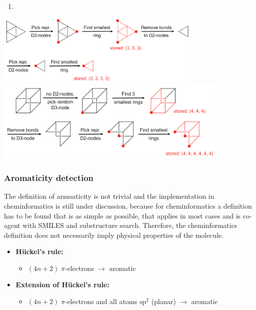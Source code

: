 \begin{enumerate}
    \item 
\end{enumerate}

\begin{center}\includegraphics[width=0.75\textwidth]{img/cheminformatics/RingPerceptionFigueras1.png}\\\includegraphics[width=0.85\textwidth]{img/cheminformatics/RingPerceptionFigueras2.png}\end{center}

%

\subsubsection{Aromaticity detection}

The definition of armoaticity is not trivial and the implementation in cheminformatics is still under discussion, because for cheminformatics a definition has to be found that is as simple as possible, that applies in most cases and is co-agent with SMILES and substructure search. Therefore, the cheminformatics definition does not necessarily imply physical properties of the molecule.

\begin{itemize}
    \item \textbf{Hückel's rule:}
    \begin{itemize}
        \item $(4n+2)\;\pi$-electrons $\rightarrow$ aromatic
    \end{itemize}
    \item \textbf{Extension of Hückel’s rule:}
    \begin{itemize}
        \item $(4n+2)\;\pi$-electrons and all atoms $\mathrm{sp}^2$ (planar) $\rightarrow$ aromatic
    \end{itemize}
\end{itemize}

